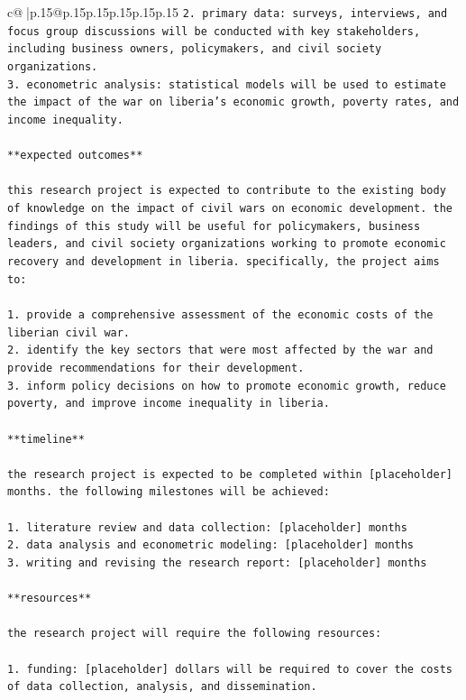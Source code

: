 \documentclass{article}
\begin{document}
{\begin{supertabular}{c@{$\;$}|p{.15\linewidth}@{}p{.15\linewidth}p{.15\linewidth}p{.15\linewidth}p{.15\linewidth}p{.15\linewidth}}
{{{\texttt{2. primary data: surveys, interviews, and focus group discussions will be conducted with key stakeholders, including business owners, policymakers, and civil society organizations.} \\
\texttt{3. econometric analysis: statistical models will be used to estimate the impact of the war on liberia's economic growth, poverty rates, and income inequality.} \\
\\ 
\texttt{**expected outcomes**} \\
\\ 
\texttt{this research project is expected to contribute to the existing body of knowledge on the impact of civil wars on economic development. the findings of this study will be useful for policymakers, business leaders, and civil society organizations working to promote economic recovery and development in liberia. specifically, the project aims to:} \\
\\ 
\texttt{1. provide a comprehensive assessment of the economic costs of the liberian civil war.} \\
\texttt{2. identify the key sectors that were most affected by the war and provide recommendations for their development.} \\
\texttt{3. inform policy decisions on how to promote economic growth, reduce poverty, and improve income inequality in liberia.} \\
\\ 
\texttt{**timeline**} \\
\\ 
\texttt{the research project is expected to be completed within {[}placeholder{]} months. the following milestones will be achieved:} \\
\\ 
\texttt{1. literature review and data collection: {[}placeholder{]} months} \\
\texttt{2. data analysis and econometric modeling: {[}placeholder{]} months} \\
\texttt{3. writing and revising the research report: {[}placeholder{]} months} \\
\\ 
\texttt{**resources**} \\
\\ 
\texttt{the research project will require the following resources:} \\
\\ 
\texttt{1. funding: {[}placeholder{]} dollars will be required to cover the costs of data collection, analysis, and dissemination.} \\
}}}
\end{supertabular}}
\end{document}
